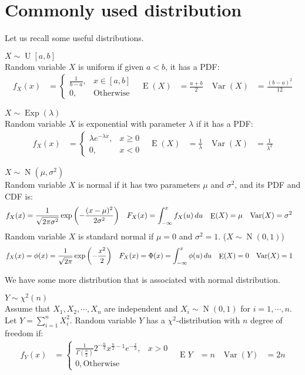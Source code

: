 \documentclass{huhtakm-template-book-v2}
\DeclareMathOperator{\E}{E}
\DeclareMathOperator{\Var}{Var}
\DeclareMathOperator{\Exp}{Exp}
\DeclareMathOperator{\N}{N}
\DeclareMathOperator{\U}{U}
\begin{document}
\section{Commonly used distribution}
Let us recall some useful distributions.
\begin{eg} $X\sim\U[a,b]$\\
	Random variable $X$ is uniform if given $a<b$, it has a PDF:
	\begin{align*}
		f_{X}(x)&=\begin{cases}
			\frac{1}{b-a}, &x\in[a,b]\\
			0, &\text{Otherwise}
		\end{cases} & \E(X)&=\frac{a+b}{2} & \Var(X)&=\frac{(b-a)^{2}}{12}
	\end{align*}
\end{eg}
\begin{eg} $X\sim\Exp(\lambda)$\\
	Random variable $X$ is exponential with parameter $\lambda$ if it has a PDF:
	\begin{align*}
		f_{X}(x)&=\begin{cases}
			\lambda e^{-\lambda x}, &x\geq 0\\
			0, &x<0
		\end{cases} & \E(X)&=\frac{1}{\lambda} & \Var(X)&=\frac{1}{\lambda^{2}}
	\end{align*}
\end{eg}
\begin{eg} $X\sim\N(\mu,\sigma^{2})$\\
	Random variable $X$ is normal if it has two parameters $\mu$ and $\sigma^{2}$, and its PDF and CDF is:
	\begin{align*}
		f_{X}(x)&=\frac{1}{\sqrt{2\pi\sigma^{2}}}\exp\left(-\frac{(x-\mu)^{2}}{2\sigma^{2}}\right) & F_{X}(x)&=\intlu{-\infty}{x}f_{X}(u)\,du & \E(X)&=\mu & \Var(X)&=\sigma^{2}
	\end{align*}
	Random variable $X$ is standard normal if $\mu=0$ and $\sigma^{2}=1$. ($X\sim\N(0,1)$)
	\begin{align*}
		f_{X}(x)&=\phi(x)=\frac{1}{\sqrt{2\pi}}\exp\left(-\frac{x^{2}}{2}\right) & F_{X}(x)&=\Phi(x)=\intlu{-\infty}{x}\phi(u)\,du & \E(X)&=0 & \Var(X)&=1
	\end{align*}
\end{eg}
We have some more distribution that is associated with normal distribution.
\begin{eg} $Y\sim\chi^{2}(n)$\\
	Assume that $X_{1},X_{2},\cdots,X_{n}$ are independent and $X_{i}\sim\N(0,1)$ for $i=1,\cdots,n$. Let $Y=\sum_{i=1}^{n}X_{i}^{2}$. Random variable $Y$ has a $\chi^{2}$-distribution with $n$ degree of freedom if:
	\begin{align*}
		f_{Y}(x)&=\begin{cases}
			\frac{1}{\Gamma(\frac{n}{2})}2^{-\frac{n}{2}}x^{\frac{n}{2}-1}e^{-\frac{x}{2}}, &x>0\\
			0, \text{Otherwise}
		\end{cases} & \E{Y}&=n & \Var(Y)&=2n
	\end{align*}
\end{eg} 
\end{document}
